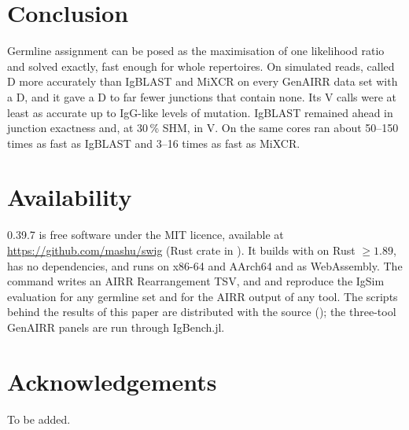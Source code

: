 \documentclass[11pt,a4paper]{article}
\begin{document}
\section{Conclusion}

Germline assignment can be posed as the maximisation of one likelihood ratio
and solved exactly, fast enough for whole repertoires. On simulated reads,
\swig{} called D more accurately than IgBLAST and MiXCR on every GenAIRR
data set with a D, and it gave a D to far fewer junctions that contain none.
Its V calls were at least as accurate up to IgG-like levels of mutation.
IgBLAST
remained ahead in junction exactness and, at 30\,\% SHM, in V. On the same
cores \swig{} ran about 50--150 times as fast as IgBLAST and 3--16 times as
fast as MiXCR.

\section*{Availability}

\swig{} 0.39.7 is free software under the MIT licence, available at
\url{https://github.com/mashu/swig} (Rust crate in ). It builds
with  on Rust $\ge 1.89$, has no dependencies,
and runs on x86-64 and AArch64 and as WebAssembly. The command
 writes an
AIRR Rearrangement TSV, and  and 
reproduce the IgSim evaluation for any germline set and for the AIRR output
of any tool. The scripts behind the results of this paper are distributed
with the source (); the three-tool GenAIRR panels are run
through IgBench.jl.


\section*{Acknowledgements}

To be added.



\end{document}
